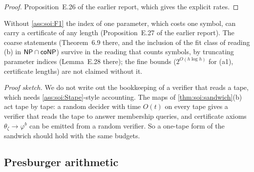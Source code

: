 \begin{proof}
Proposition~E.26 of the earlier report, which gives the explicit rates.
\end{proof}

\begin{remark}\label{rem:soi:F1}
Without \cref{ass:soi:F1} the index of one parameter, which costs one symbol, can carry a certificate of any length (Proposition~E.27 of the earlier report). The coarse statements (Theorem~6.9 there, and the inclusion of the fit class of reading (b) in $\mathsf{NP}\cap\mathsf{coNP}$) survive in the reading that counts symbols, by truncating parameter indices (Lemma~E.28 there); the fine bounds ($2^{O(h\log h)}$ for (a1), certificate lengths) are not claimed without it.
\end{remark}

\begin{remark}\label{rem:soi:onetapesandwich}
\emph{Proof sketch.} We do not write out the bookkeeping of a verifier that reads a tape, which needs \cref{ass:soi:Stape}-style accounting. The maps of \cref{thm:soi:sandwich}(b) act tape by tape: a random decider with time $O(t)$ on every tape gives a verifier that reads the tape to answer membership queries, and certificate axioms $\theta_\zeta\to\varphi^b$ can be emitted from a random verifier. So a one-tape form of the sandwich should hold with the same budgets.
\end{remark}

\subsection{Presburger arithmetic}\label{sec:app:soi:presburger}

